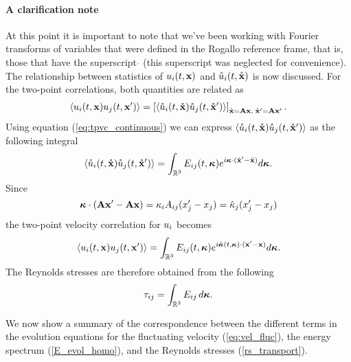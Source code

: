 \documentclass[oneside,a4paper,11pt]{report}
\begin{document}
\paragraph{A clarification note}
At this point it is important to note that we've been working with Fourier transforms of variables that were defined in the Rogallo reference frame, that is, those that have the superscript $\mathring{}$ (this superscript was neglected for convenience). The relationship between statistics of $u_i(t,\mathbf{x})$ and $\mathring{u}_i(t,\mathring{\mathbf{x}})$ is now discussed. For the two-point correlations, both quantities are related as
\begin{equation}
\langle u_i(t,\mathbf{x}) u_j(t,\mathbf{x}') \rangle = \left [ \langle \mathring{u}_i(t,\mathring{\mathbf{x}}) \mathring{u}_j(t,\mathring{\mathbf{x}}') \rangle \right ]_{\mathring{\mathbf{x}} = \bold{A}\mathbf{x}, \; \mathring{\mathbf{x}}' = \bold{A}\mathbf{x}'}.
\end{equation}
Using equation (\ref{eq:tpvc_continuous}) we can express $\langle \mathring{u}_i(t,\mathring{\mathbf{x}}) \mathring{u}_j(t,\mathring{\mathbf{x}}') \rangle$ as the following integral
\begin{equation}
\langle \mathring{u}_i(t,\mathring{\mathbf{x}}) \mathring{u}_j(t,\mathring{\mathbf{x}}') \rangle = \int_{\mathbb{R}^3} E_{ij}(t,\boldsymbol\kappa) e^{i\boldsymbol\kappa \cdot (\mathring{\mathbf{x}}' - \mathring{\mathbf{x}})} d\boldsymbol\kappa.
\end{equation}
Since
\begin{equation}
\boldsymbol\kappa \cdot ( \mathbf{A} \mathbf{x}' - \mathbf{A} \mathbf{x}) = \kappa_iA_{ij} (x'_j - x_j) = \hat{\kappa}_j (x'_j - x_j)
\end{equation}
the two-point velocity correlation for $u_i$ becomes
\begin{equation}
\langle u_i(t,\mathbf{x}) u_j(t,\mathbf{x}') \rangle = \int_{\mathbb{R}^3} E_{ij}(t,\boldsymbol\kappa) e^{i \hat{\boldsymbol\kappa}(t,\boldsymbol\kappa) \cdot ( \mathbf{x}' - \mathbf{x})} d\boldsymbol\kappa .
\end{equation}
The Reynolds stresses are therefore obtained from the following
\begin{equation}
\tau_{ij} = \int_{\mathbb{R}^3} E_{ij} \, d\boldsymbol\kappa.
\end{equation}

We now show a summary of the correspondence between the different terms in the evolution equations for the fluctuating velocity (\ref{eq:vel_fluc}), the energy spectrum (\ref{E_evol_homo}), and the Reynolds stresses (\ref{rs_transport}).
\end{document}
